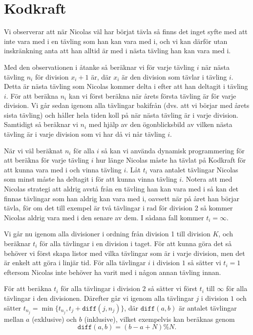 \section{Kodkraft}
Vi observerar att när Nicolas väl har börjat tävla så finns det inget syfte med att inte vara med i en tävling som han kan vara med i, och vi kan därför utan inskränkning anta att han alltid är med i nästa tävling han kan vara med i.

Med den observationen i åtanke så beräknar vi för varje tävling $i$ när nästa tävling $n_i$ för division $x_i + 1$ är, där $x_i$ är den division som tävlar i tävling $i$. Detta är nästa tävling som Nicolas kommer delta i efter att han deltagit i tävling $i$. För att beräkna $n_i$ kan vi först beräkna när årets första tävling är för varje division. Vi går sedan igenom alla tävlingar bakifrån (dvs. att vi börjar med årets sista tävling) och håller hela tiden koll på när nästa tävling är i varje division. Samtidigt så beräknar vi $n_i$ med hjälp av den ögonblicksbild av vilken nästa tävling är i varje division som vi har då vi når tävling $i$.

När vi väl beräknat $n_i$ för alla $i$ så kan vi använda dynamisk programmering för att beräkna för varje tävling $i$ hur länge Nicolas måste ha tävlat på Kodkraft för att kunna vara med i och vinna tävling $i$. Låt $t_i$ vara antalet tävlingar Nicolas som minst måste ha deltagit i för att kunna vinna tävling $i$. Notera att med Nicolas strategi att aldrig avstå från en tävling han kan vara med i så kan det finnas tävlingar som han aldrig kan vara med i, oavsett när på året han börjar tävla, för om det till exempel är två tävlingar i rad för division 2 så kommer Nicolas aldrig vara med i den senare av dem. I sådana fall kommer $t_i = \infty$.

Vi går nu igenom alla divisioner i ordning från division 1 till division $K$, och beräknar $t_i$ för alla tävlingar i en division i taget. För att kunna göra det så behöver vi först skapa listor med vilka tävlingar som är i varje division, men det är enkelt att göra i linjär tid. För alla tävlingar $i$ i division $1$ så sätter vi $t_i=1$ eftersom Nicolas inte behöver ha varit med i någon annan tävling innan.

För att beräkna $t_i$ för alla tävlingar i division $2$ så sätter vi först $t_i$ till $\infty$ för alla tävlingar i den divisionen. Därefter går vi igenom alla tävlingar $j$ i division $1$ och sätter $t_{n_j}=\min\{t_{n_j}, t_j+\texttt{diff}(j,n_j)\}$, där $\texttt{diff}(a,b)$ är antalet tävlingar mellan $a$ (exklusive) och $b$ (inklusive), vilket exempelvis kan beräknas genom
$$\texttt{diff}(a,b)=(b-a+N)\% N.$$

